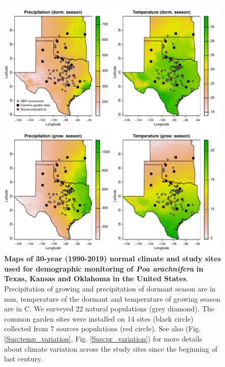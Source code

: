 \documentclass[12pt]{article}
\begin{document}
\begin{figure}[H]
  \begin{center}
    \includegraphics[width=0.90\linewidth]{Figures/POAR_survey_garden_map.pdf}
  \caption{\textbf{Maps of 30-year (1990-2019) normal climate and study sites used for demographic monitoring of \emph{Poa arachnifera} in Texas, Kansas and Oklahoma in the United States}.
  Precipitation of growing and precipitation of dormant season are in mm, temperature of the dormant and temperature of growing season are in \degree C.
  We surveyed 22 natural populations (grey diamond).
  The common garden sites were installed on 14 sites (black circle) collected from 7 sources populations (red circle).
  See also (Fig. \ref{Sup:temp_variation}, Fig. \ref{Sup:pr_variation}) for more details about climate variation across the study sites since the beginning of last century.}
  \label{fig:study_design}
  \end{center}
\end{figure}
\end{document}
